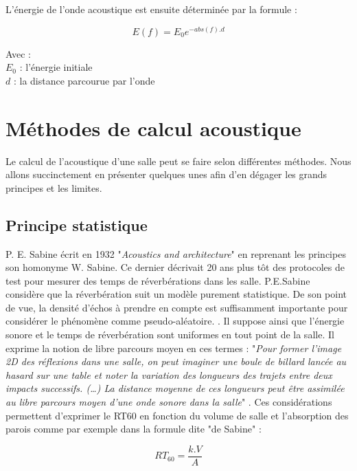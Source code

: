 L'énergie de l'onde acoustique est ensuite déterminée par la formule :


\begin{equation}
	E(f) = E_0 e^{-abs(f).d}
\end{equation}

Avec : \\
$E_0$ : l'énergie initiale \\
$d$ : la distance parcourue par l'onde \\






\section{Méthodes de calcul acoustique} 
Le calcul de l'acoustique d'une salle peut se faire selon différentes méthodes. Nous allons succinctement en présenter quelques unes afin d'en dégager les grands principes et les limites.

	\subsection{Principe statistique} \label{sect_sabine}

P. E. Sabine écrit en 1932 "\textit{Acoustics and architecture}" en reprenant les principes son homonyme W. Sabine. Ce dernier décrivait 20 ans plus tôt des protocoles de test pour mesurer des temps de réverbérations dans les salle. P.E.Sabine considère que la réverbération suit un modèle purement statistique. De son point de vue, la densité d'échos à prendre en compte est suffisamment importante pour considérer le phénomène comme pseudo-aléatoire. \cite[p. 19]{Kandelman}. Il suppose ainsi que l’énergie sonore et le temps de réverbération sont uniformes en tout point de la salle. Il exprime la notion de libre parcours moyen en ces termes : "\textit{Pour former l’image 2D des réflexions dans une salle, on peut imaginer une boule de billard lancée au hasard sur une table et noter la variation des longueurs des trajets entre deux impacts successifs. (…) La distance moyenne de ces longueurs peut être assimilée au libre parcours moyen d’une onde sonore dans la salle}" \cite[]{sabine2}. Ces considérations permettent d'exprimer le \gls{RT60} en fonction du volume de salle et l'absorption des parois comme par exemple dans la formule dite "de Sabine" : 

\begin{equation}
   	RT_{60} = \frac{k.V}{A}
\end{equation}

